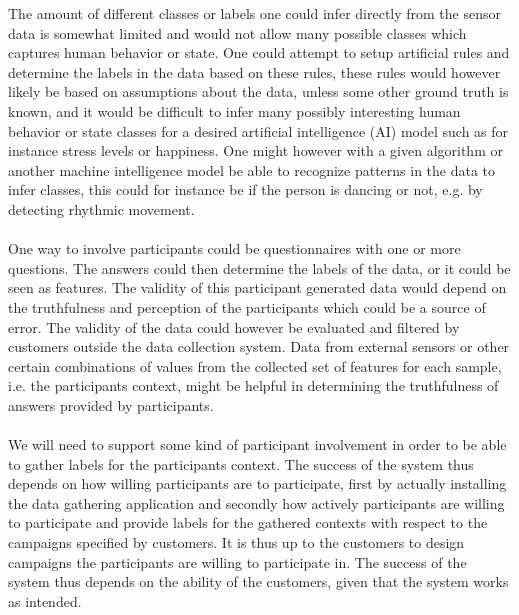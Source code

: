 The amount of different classes or labels one could infer directly from the sensor data is somewhat limited and would not allow many possible classes which captures human behavior or state. One could attempt to setup artificial rules and determine the labels in the data based on these rules, these rules would however likely be based on assumptions about the data, unless some other ground truth is known, and it would be difficult to infer many possibly interesting human behavior or state classes for a desired artificial intelligence (AI) model such as for instance stress levels or happiness. One might however with a given algorithm or another machine intelligence model be able to recognize patterns in the data to infer classes, this could for instance be if the person is dancing or not, e.g. by detecting rhythmic movement.    
\\\\
One way to involve participants could be questionnaires with one or more questions. The answers could then determine the labels of the data, or it could be seen as features. The validity of this participant generated data would depend on the truthfulness and perception of the participants which could be a source of error. The validity of the data could however be evaluated and filtered by customers outside the data collection system. Data from external sensors or other certain combinations of values from the collected set of features for each sample, i.e. the participants context, might be helpful in determining the truthfulness of answers provided by participants.
\\\\
We will need to support some kind of participant involvement in order to be able to gather labels for the participants context. The success of the system thus depends on how willing participants are to participate, first by actually installing the data gathering application and secondly how actively participants are willing to participate and provide labels for the gathered contexts with respect to the campaigns specified by customers. It is thus up to the customers to design campaigns the participants are willing to participate in. The success of the system thus depends on the ability of the customers, given that the system works as intended.
